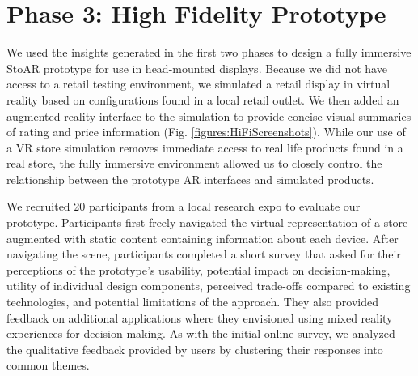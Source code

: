 \section{Phase 3: High Fidelity Prototype}
We used the insights generated in the first two phases to design a fully immersive StoAR prototype for use in head-mounted displays. Because we did not have access to a retail testing environment, we simulated a retail display in virtual reality based on configurations found in a local retail outlet. We then added an augmented reality interface to the simulation to provide concise visual summaries of rating and price information (Fig. \ref{figures:HiFiScreenshots}).
While our use of a VR store simulation removes immediate access to real life products found in a real store, the fully immersive environment allowed us to closely control the relationship between the prototype AR interfaces and simulated products.

We recruited 20 participants from a local research expo to evaluate our prototype. Participants first freely navigated the virtual representation of a store augmented with static content containing information about each device. After navigating the scene, participants completed a short survey that asked for their perceptions of the prototype's usability, potential impact on decision-making, utility of individual design components, perceived trade-offs compared to existing technologies, and potential limitations of the approach. They also provided feedback on additional applications where they envisioned using mixed reality experiences for decision making. As with the initial online survey, we analyzed the qualitative feedback provided by users by clustering their responses into common themes. 

